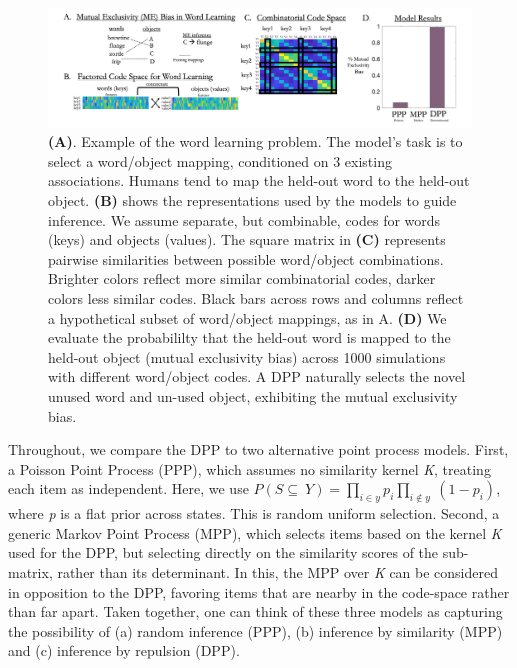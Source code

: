 \documentclass[10pt,letterpaper]{article}
\begin{document}
\begin{figure}[h]
  \centering \includegraphics[width=\textwidth]{Figure2.png}
  \caption{\textbf{(A)}. Example of the word learning problem. The model’s task is to select a word/object mapping, conditioned on 3 existing associations. Humans tend to map the held-out word to the held-out object.
\textbf{(B)} shows the representations used by the models to guide inference. We assume separate, but combinable, codes for words (keys) and objects (values). The square matrix in \textbf{(C)} represents pairwise similarities between possible word/object combinations. Brighter colors reflect more similar combinatorial codes, darker colors less similar codes. Black bars across rows and columns reflect a hypothetical subset of word/object mappings, as in A.
\textbf{(D)} We evaluate the probabililty that the held-out word is mapped to the held-out object (mutual exclusivity bias) across 1000 simulations with different word/object codes. A DPP naturally selects the novel unused word and un-used object, exhibiting the mutual exclusivity bias.
}
\end{figure}

Throughout, we compare the DPP to two alternative point process models. First, a Poisson Point Process (PPP), which assumes no similarity kernel \textit{K}, treating each item as independent. Here, we use \(P (S \subseteq\ Y) = \prod_ {i\in y} p_i \prod_ {i\notin y} \ (1-p_i)\), where \textit{p} is a flat prior across states. This is random uniform selection. Second, a generic Markov Point Process (MPP), which selects items based on the kernel \textit{K} used for the DPP, but selecting directly on the similarity scores of the sub-matrix, rather than its determinant. In this, the MPP over \textit{K} can be considered in opposition to the DPP, favoring items that are nearby in the code-space rather than far apart. Taken together, one can think of these three models as capturing the possibility of (a) random inference (PPP), (b) inference by similarity (MPP) and (c) inference by repulsion (DPP).
\end{document}
